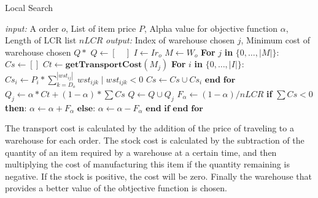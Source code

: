 \documentclass[letterpaper]{article} %
\begin{document}
\begin{algorithm}[H] \label{code:LocalSearch}
    \caption{Local Search}
    \begin{algorithmic}[1]
        \STATE \textit{input: } A order $o$, List of item price $P$, Alpha value for objective function $\alpha$, Length of LCR list $nLCR$
        \STATE \textit{output: } Index of warehouse chosen $j$, Minimum cost of warehouse chosen $Q*$
        \STATE  $Q \longleftarrow [\quad]$
        \STATE  $I \longleftarrow Ir_{o}$
        \STATE  $M \longleftarrow W_{o}$
        \STATE  \textbf{For} $j$ \textbf{in} $\{ 0,\dots,|M|\}$:
        \STATE  \quad $Cs \longleftarrow []$
        \STATE  \quad $Ct \longleftarrow \textbf{getTransportCost}(M_j) $ \label{eq:ct}
        \STATE  \quad \textbf{For} $i$ \textbf{in} $\{ 0,\dots,|I|\}$:
        \STATE  \quad \quad $Cs_i \longleftarrow P_i * \sum_{k=D_{o}}^{|wst_{ij}|} wst_{ijk}\; |\; wst_{ijk} < 0 $ 
        \STATE  \quad \quad$Cs \longleftarrow Cs \cup Cs_i $ \label{eq:cs}
        \STATE  \quad  $\textbf{end for}$
        \STATE  \quad $Q_j \longleftarrow \alpha * Ct + (1 - \alpha) * \sum Cs$ \label{eq:fitness}
        \STATE  \quad $Q \longleftarrow Q \cup Q_j$ \label{eq:fitness}
        \STATE  \quad $F_{\alpha}  \longleftarrow (1-\alpha) / nLCR$ \label{eq:fitness}
        \STATE  \quad \textbf{if} $\sum Cs < 0$ \textbf{then}:
        \STATE  \quad \quad $\alpha \longleftarrow \alpha + F_{\alpha}$
        \STATE  \quad $\textbf{else:}$
        \STATE  \quad \quad $\alpha \longleftarrow \alpha - F_{\alpha}$
        \STATE  \quad $\textbf{end if}$
        \STATE  $\textbf{end for}$
    \end{algorithmic}
\end{algorithm}


The transport cost is calculated by the addition of the price of traveling to a warehouse for each order. The stock cost is calculated by the subtraction of the quantity of an item required by a warehouse at a certain time, and then multiplying the cost of manufacturing this item if the quantity remaining is negative. If the stock is positive, the cost will be zero. Finally the warehouse that provides a better value of the obtjective function is chosen.
\end{document}
